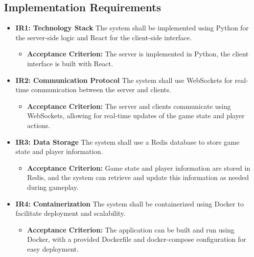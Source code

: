 \documentclass{scrartcl}
\begin{document}
\subsection{Implementation Requirements}
\label{implementation-requirements}

%
\begin{itemize}
  \item \textbf{IR1: Technology Stack} \newline
  The system shall be implemented using Python for the server-side logic and React for the client-side interface.
  \begin{itemize}
    \item \textbf{Acceptance Criterion:} The server is implemented in Python, the client interface is built with React.
  \end{itemize}

  \item \textbf{IR2: Communication Protocol} \newline
  The system shall use WebSockets for real-time communication between the server and clients.
  \begin{itemize}
    \item \textbf{Acceptance Criterion:} The server and clients communicate using WebSockets, allowing for real-time updates of the game state and player actions.
  \end{itemize}

  \item \textbf{IR3: Data Storage} \newline
  The system shall use a Redis database to store game state and player information.
  \begin{itemize}
    \item \textbf{Acceptance Criterion:} Game state and player information are stored in Redis, and the system can retrieve and update this information as needed during gameplay.
  \end{itemize}

  \item \textbf{IR4: Containerization} \newline
  The system shall be containerized using Docker to facilitate deployment and scalability.
  \begin{itemize}
    \item \textbf{Acceptance Criterion:} The application can be built and run using Docker, with a provided Dockerfile and docker-compose configuration for easy deployment.
  \end{itemize}

\end{itemize}
\end{document}
